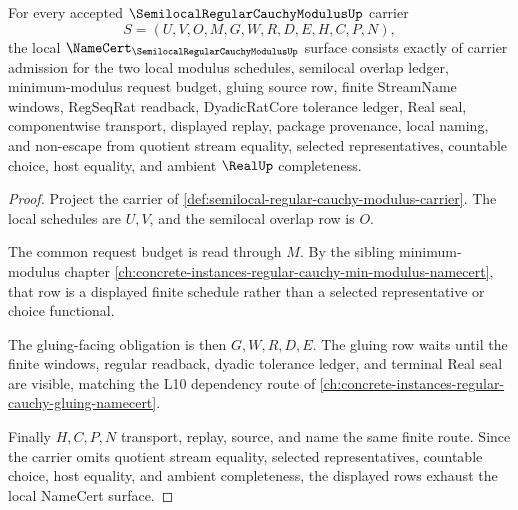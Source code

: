 \begin{theorem}
\label{thm:semilocal-regular-cauchy-modulus-namecert-obligations}
For every accepted $\SemilocalRegularCauchyModulusUp$ carrier
$$
S=(U,V,O,M,G,W,R,D,E,H,C,P,N),
$$
the local $\NameCert_{\SemilocalRegularCauchyModulusUp}$ surface consists exactly of carrier admission for the two local modulus schedules, semilocal overlap ledger, minimum-modulus request budget, gluing source row, finite StreamName windows, RegSeqRat readback, DyadicRatCore tolerance ledger, Real seal, componentwise transport, displayed replay, package provenance, local naming, and non-escape from quotient stream equality, selected representatives, countable choice, host equality, and ambient $\RealUp$ completeness.
\end{theorem}
\begin{proof}
Project the carrier of \autoref{def:semilocal-regular-cauchy-modulus-carrier}. The local schedules are $U,V$, and the semilocal overlap row is $O$.

The common request budget is read through $M$. By the sibling minimum-modulus chapter \autoref{ch:concrete-instances-regular-cauchy-min-modulus-namecert}, that row is a displayed finite schedule rather than a selected representative or choice functional.

The gluing-facing obligation is then $G,W,R,D,E$. The gluing row waits until the finite windows, regular readback, dyadic tolerance ledger, and terminal Real seal are visible, matching the L10 dependency route of \autoref{ch:concrete-instances-regular-cauchy-gluing-namecert}.

Finally $H,C,P,N$ transport, replay, source, and name the same finite route. Since the carrier omits quotient stream equality, selected representatives, countable choice, host equality, and ambient completeness, the displayed rows exhaust the local NameCert surface.
\end{proof}

